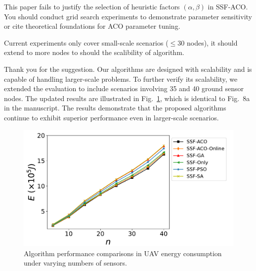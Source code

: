 \reviewer

\begin{revcomment}
	This paper fails to justify the selection of heuristic factors $(\alpha, \beta)$ in SSF-ACO. You should conduct grid search experiments to demonstrate parameter sensitivity or cite theoretical foundations for ACO parameter tuning.
\end{revcomment}
\begin{revresponse}

\end{revresponse}

\begin{revcomment}
	Current experiments only cover small-scale scenarios ($\leq 30$ nodes), it should extend to more nodes to should the scalibility of algorithm.
\end{revcomment}
\begin{revresponse}
	Thank you for the suggestion.
	Our algorithms are designed with scalability and is capable of handling larger-scale problems.
	To further verify its scalability, we extended the evaluation to include scenarios involving 35 and 40 ground sensor nodes. The updated results are illustrated in Fig.~\ref{fig:40nodes}, which is identical to Fig.~8a in the manuscript. The results demonstrate that the proposed algorithms continue to exhibit superior performance even in larger-scale scenarios.
	\begin{figure}[h]
		\centerline{\includegraphics[width=.6\textwidth]{fig/exp_number_40_legend.pdf}}
		\caption{Algorithm performance comparisons in UAV energy consumption under varying numbers of sensors.}
		\label{fig:40nodes}
	\end{figure}
\end{revresponse}

